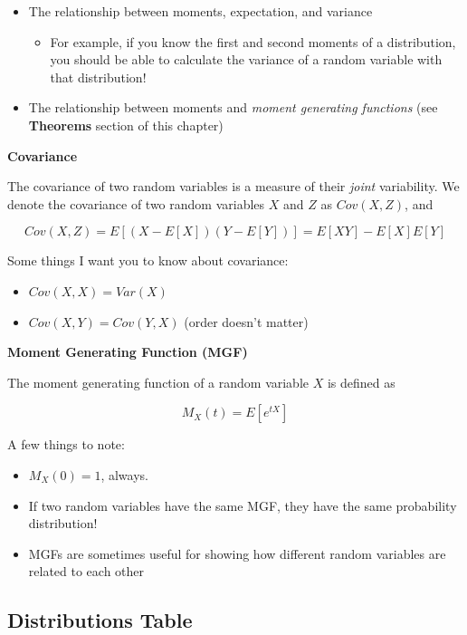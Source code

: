 \documentclass[
  letterpaper,
  DIV=11,
  numbers=noendperiod]{scrreprt}
\providecommand{\tightlist}{%
  \setlength{\itemsep}{0pt}\setlength{\parskip}{0pt}}\usepackage{longtable,booktabs,array}
\begin{document}
\begin{itemize}
\item
  The relationship between moments, expectation, and variance

  \begin{itemize}
  \tightlist
  \item
    For example, if you know the first and second moments of a
    distribution, you should be able to calculate the variance of a
    random variable with that distribution!
  \end{itemize}
\item
  The relationship between moments and \emph{moment generating
  functions} (see \textbf{Theorems} section of this chapter)
\end{itemize}

\textbf{Covariance}

The covariance of two random variables is a measure of their
\emph{joint} variability. We denote the covariance of two random
variables \(X\) and \(Z\) as \(Cov(X,Z)\), and

\[
Cov(X, Z) = E[(X - E[X])(Y - E[Y])] = E[XY] - E[X]E[Y]
\]

Some things I want you to know about covariance:

\begin{itemize}
\item
  \(Cov(X, X) = Var(X)\)
\item
  \(Cov(X, Y) = Cov(Y, X)\) (order doesn't matter)
\end{itemize}

\textbf{Moment Generating Function (MGF)}

The moment generating function of a random variable \(X\) is defined as

\[
M_X(t) = E[e^{tX}]
\]

A few things to note:

\begin{itemize}
\item
  \(M_X(0) = 1\), always.
\item
  If two random variables have the same MGF, they have the same
  probability distribution!
\item
  MGFs are sometimes useful for showing how different random variables
  are related to each other
\end{itemize}

\hypertarget{distributions-table}{%
\subsection{Distributions Table}\label{distributions-table}}
\end{document}
